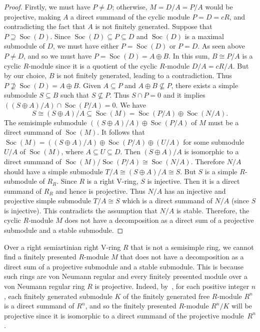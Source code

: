 \documentclass[11pt,a4paper]{amsart}
\theoremstyle{plain}
\theoremstyle{definition}
\theoremstyle{remark}
\newcommand{\Soc}{\operatorname{Soc}}
\begin{document}
\begin{proof}
Firstly, we must have $ P\neq D $; otherwise, $M=D/A=P/A$ would be projective, making $ A $  a direct summand of the cyclic module $P=D=cR$, and contradicting the fact that $ A $ is not finitely generated. Suppose that $P\supseteq \Soc(D)$. Since $\Soc(D)\subseteq P \subseteq D$ and $\Soc(D)$ is a maximal submodule of $D$, we must have either $P=\Soc(D)$ or $P=D$. As seen above $P\neq D$, and so we must have $P=\Soc(D)=A\oplus B$. In this sum, $B\cong  P/A$ is a cyclic $R$-module since it is a quotient of the cyclic $R$-module $D/A=cR/A$. But by our choice, $B$ is not finitely generated, leading to a contradiction. Thus $P\nsupseteq \Soc(D)=A\oplus B$. Given $A\subseteq P$ and $A\oplus B\nsubseteq P$, there exists a simple submodule $S\subseteq B$ such that $S \nsubseteq P$. Thus $S\cap P=0$ and it implies $\left((S\oplus A)/A\right)\cap \Soc(P/A)=0$. We have
 \[S\cong(S\oplus A)/ A \subseteq \Soc(M)=\Soc(P/A)\oplus \Soc(N/A).\]
 The {semisimple submodule  $\left((S\oplus A)/A\right) \oplus \Soc(P/A) $ of $ M $ must be a direct summand of $ \Soc(M) $. It follows that} $\Soc(M)= ((S\oplus A)/A) \oplus  \Soc(P/A) \oplus (U/A)$ for some submodule $U/A$ of $\Soc(M)$, where $A\subseteq U\subseteq D$. Then $(S\oplus A)/A$ is isomorphic to a direct summand of $\Soc(M)/\Soc(P/A)\cong \Soc(N/A)$. Therefore $N/A$ should have a simple submodule $T/A\cong (S\oplus A)/ A \cong S$. But $S$ is a simple $R$-submodule of $R_R$. Since $R$ is a right V-ring, $S$ is injective. Then it is a direct summand of $R_R$ and hence is projective. Thus $N/A$ has an injective and projective simple submodule $T/A \cong S$ which is a direct summand of $N/A$ (since $S$ is injective). This contradicts the assumption that $N/A$ {is stable}. Therefore, the cyclic $R$-module $M$ does not have a decomposition as a direct sum of a projective submodule and a stable submodule.
\end{proof}

Over a right semiartinian right V-ring $R$ that is not a semisimple ring, we cannot find a finitely presented $R$-module $M$ that does not have a decomposition as a direct sum of a projective submodule and a stable submodule. {This is} because such rings are von Neumann regular and every finitely presented module over a von Neumann regular ring $ R $ is projective. Indeed, by~\cite[Theorem 1.11]{Goodearl:VonNeumannRegularRings}, for each positive integer $ n$, each finitely generated submodule $K$ of the finitely generated free $R$-module $R^{n}$ is a direct summand of $R^{n}$, and so the finitely presented $R$-module $ R^{n}/K$ will be projective since it is isomorphic to a direct summand of the projective module~$ R^n $.
\end{document}
